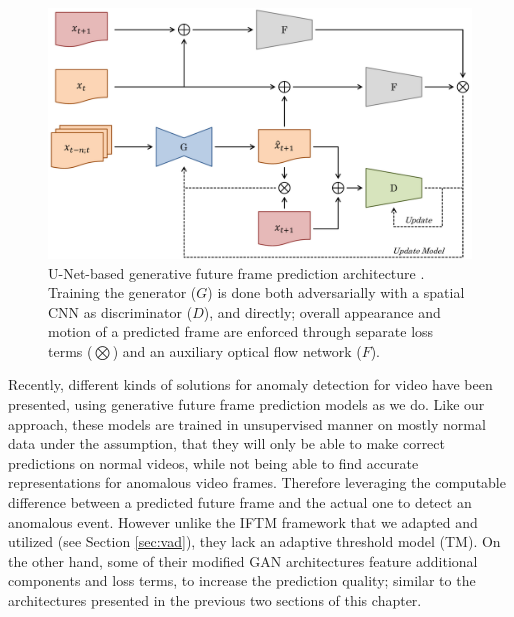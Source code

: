 \begin{figure}
	\centering
	\includegraphics[width=1\textwidth]{graphics/gan/unet/unet.pdf}
  \caption[U-Net-based generative future frame prediction architecture.]{U-Net-based generative future frame prediction architecture \cite{liu2018future}. Training the generator ($G$) is done both adversarially with a spatial CNN as discriminator ($D$), and directly; overall appearance and motion of a predicted frame are enforced through separate loss terms ($\bigotimes$) and an auxiliary optical flow network ($F$).}
  \label{fig:u_net}
\end{figure}

Recently, different kinds of solutions for anomaly detection for video have been presented, using generative future frame prediction models as we do. Like our approach, these models are trained in unsupervised manner on mostly normal data under the assumption, that they will only be able to make correct predictions on normal videos, while not being able to find accurate representations for anomalous video frames. Therefore leveraging the computable difference between a predicted future frame and the actual one to detect an anomalous event. However unlike the IFTM framework that we adapted and utilized (see Section \ref{sec:vad}), they lack an adaptive threshold model (TM). On the other hand, some of their modified GAN architectures feature additional components and loss terms, to increase the prediction quality; similar to the architectures presented in the previous two sections of this chapter.

